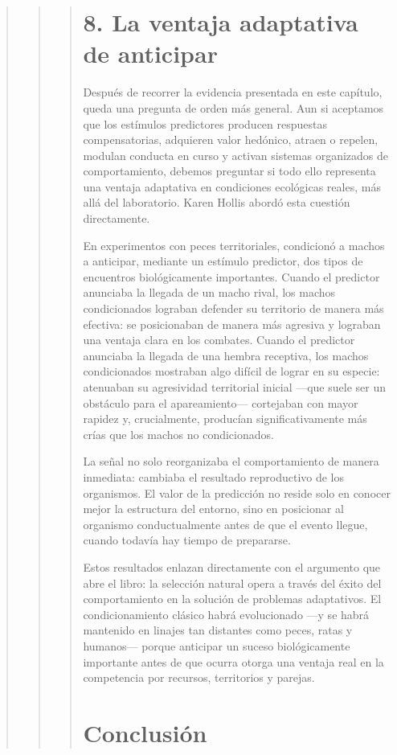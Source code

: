 \documentclass[
  letterpaper,
  DIV=11,
  numbers=noendperiod]{scrreprt}
\begin{document}
\begin{tcolorbox}[enhanced jigsaw, arc=.35mm, bottomrule=.15mm, breakable, colback=white, colframe=quarto-callout-note-color-frame, left=2mm, leftrule=.75mm, opacityback=0, rightrule=.15mm, toprule=.15mm]
\begin{quote}
\begin{quote}
\begin{quote}
\mbox{}%
\section{8. La ventaja adaptativa de
anticipar}\label{la-ventaja-adaptativa-de-anticipar}

Después de recorrer la evidencia presentada en este capítulo, queda una
pregunta de orden más general. Aun si aceptamos que los estímulos
predictores producen respuestas compensatorias, adquieren valor
hedónico, atraen o repelen, modulan conducta en curso y activan sistemas
organizados de comportamiento, debemos preguntar si todo ello representa
una ventaja adaptativa en condiciones ecológicas reales, más allá del
laboratorio. Karen Hollis abordó esta cuestión directamente.

En experimentos con peces territoriales, condicionó a machos a
anticipar, mediante un estímulo predictor, dos tipos de encuentros
biológicamente importantes. Cuando el predictor anunciaba la llegada de
un macho rival, los machos condicionados lograban defender su territorio
de manera más efectiva: se posicionaban de manera más agresiva y
lograban una ventaja clara en los combates. Cuando el predictor
anunciaba la llegada de una hembra receptiva, los machos condicionados
mostraban algo difícil de lograr en su especie: atenuaban su agresividad
territorial inicial ---que suele ser un obstáculo para el
apareamiento--- cortejaban con mayor rapidez y, crucialmente, producían
significativamente más crías que los machos no condicionados.

La señal no solo reorganizaba el comportamiento de manera inmediata:
cambiaba el resultado reproductivo de los organismos. El valor de la
predicción no reside solo en conocer mejor la estructura del entorno,
sino en posicionar al organismo conductualmente antes de que el evento
llegue, cuando todavía hay tiempo de prepararse.

Estos resultados enlazan directamente con el argumento que abre el
libro: la selección natural opera a través del éxito del comportamiento
en la solución de problemas adaptativos. El condicionamiento clásico
habrá evolucionado ---y se habrá mantenido en linajes tan distantes como
peces, ratas y humanos--- porque anticipar un suceso biológicamente
importante antes de que ocurra otorga una ventaja real en la competencia
por recursos, territorios y parejas.

\mbox{}%
\section{Conclusión}\label{conclusiuxf3n-1}


\end{quote}
\end{quote}
\end{quote}
\end{tcolorbox}
\end{document}
